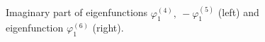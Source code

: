 \documentclass[authoryear]{elsarticle}
\begin{document}
\begin{figure}[!h]
  \begin{center}
\begin{minipage}{0.49\linewidth}
 \\
\end{minipage}
\hfill
\begin{minipage}{0.49\linewidth}
 \\
\end{minipage}
\caption{Imaginary part of eigenfunctions $\varphi^{(4)}_1, \ - \varphi^{(5)}_1$ (left) and  eigenfunction $\varphi^{(6)}_1$  (right).}
\label{fig:6}
  \end{center}
\end{figure}
\end{document}
